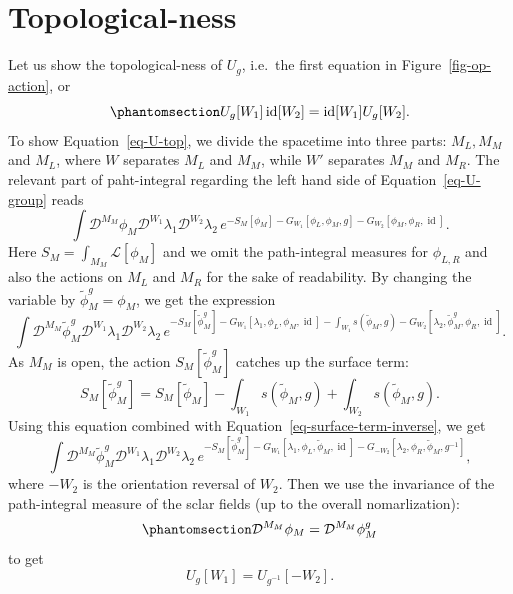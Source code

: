 \documentclass[11pt,toc=bibliography]{scrbook}
\DeclareMathOperator{\id}{id}
\numberwithin{equation}{section}
\DeclareMathOperator{\id}{id}
\begin{document}
\section{Topological-ness}\label{topological-ness}

Let us show the topological-ness of \(U_g\), i.e.~the first equation in
Figure~\ref{fig-op-action}, or
\begin{equation}\phantomsection\label{eq-U-top}{
U_{g}[W_1]\id[W_2] = \id[W_1]U_{g}[W_2].
}\end{equation} To show Equation~\ref{eq-U-top}, we divide the spacetime
into three parts: \(M_L,M_M\) and \(M_L\), where \(W\) separates \(M_L\)
and \(M_M\), while \(W'\) separates \(M_M\) and \(M_R\). The relevant
part of paht-integral regarding the left hand side of
Equation~\ref{eq-U-group} reads \[
\int\mathcal{D}^{M_M}\phi_M\mathcal{D}^{W_1}\lambda_1\mathcal{D}^{W_2}\lambda_2 \, e^{-S_M[\phi_M]-G_{W_1}[\phi_L,\phi_M,g]-G_{W_2}[\phi_M,\phi_R,\id]}.
\] Here \(S_M = \int_{M_M}\mathcal{L}[\phi_M]\) and we omit the
path-integral measures for \(\phi_{L,R}\) and also the actions on
\(M_L\) and \(M_R\) for the sake of readability. By changing the
variable by \(\tilde{\phi}_M^{g} = \phi_M\), we get the expression \[
\int\mathcal{D}^{M_M}\tilde{\phi}_M^g\mathcal{D}^{W_1}\lambda_1\mathcal{D}^{W_2}\lambda_2 \, e^{-S_M[\tilde\phi_M^g]-G_{W_1}[\lambda_1,\phi_L,\phi_M,\id] - \int_{W_1} s(\tilde\phi_M,g) -G_{W_2}[\lambda_2,\tilde\phi_M^g,\phi_R,\id]}.
\] As \(M_M\) is open, the action \(S_M[\tilde\phi_M^g]\) catches up the
surface term: \[
S_M[\tilde\phi_M^g] = S_M[\tilde\phi_M] - \int_{W_1} s(\tilde{\phi}_M,g) + \int_{W_2} s(\tilde{\phi}_M,g).
\] Using this equation combined with
Equation~\ref{eq-surface-term-inverse}, we get \[
\int\mathcal{D}^{M_M}\tilde{\phi}_M^g\mathcal{D}^{W_1}\lambda_1\mathcal{D}^{W_2}\lambda_2 \, e^{-S_M[\tilde\phi_M^g]-G_{W_1}[\lambda_1,\phi_L,\tilde\phi_M,\id] -G_{-W_2}[\lambda_2,\phi_R,\tilde\phi_M,g^{-1}]},
\] where \(-W_2\) is the orientation reversal of \(W_2\). Then we use
the invariance of the path-integral measure of the sclar fields (up to
the overall nomarlization):
\begin{equation}\phantomsection\label{eq-measure-inv}{\mathcal{D}^{M_M}\phi_M = \mathcal{D}^{M_M}\phi_M^g
}\end{equation} to get \[
U_{g}[W_1]= U_{g^{-1}}[-W_2].
\]
\end{document}
